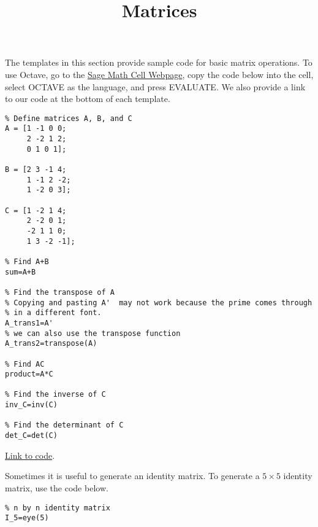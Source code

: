 \documentclass{ximera}
\title{Matrices} \license{CC BY-NC-SA 4.0}
\begin{document}
\begin{abstract}
\end{abstract}
\maketitle

The templates in this section provide sample code for basic matrix operations.  To use Octave, go to the \href{https://sagecell.sagemath.org/}{Sage Math Cell Webpage}, copy the code below into the cell, select OCTAVE as the language, and press EVALUATE.  We also provide a link to our code at the bottom of each template.

\begin{template}\label{temp:matrixOps}

\begin{verbatim}
% Define matrices A, B, and C
A = [1 -1 0 0;
     2 -2 1 2;
     0 1 0 1];
     
B = [2 3 -1 4;
     1 -1 2 -2;
     1 -2 0 3];   
     
C = [1 -2 1 4;
     2 -2 0 1;
     -2 1 1 0;
     1 3 -2 -1];     
     
% Find A+B
sum=A+B

% Find the transpose of A
% Copying and pasting A'  may not work because the prime comes through
% in a different font.
A_trans1=A'
% we can also use the transpose function
A_trans2=transpose(A)

% Find AC
product=A*C

% Find the inverse of C
inv_C=inv(C)

% Find the determinant of C
det_C=det(C)
\end{verbatim}

\href{https://sagecell.sagemath.org/?z=eJxdUEFuwyAQvFvyH-YSNWkTyZDcIg6Yqp-oogjZWEGqIcK4_X4XartOOKyY2ZmdhQ3eTWedQa9jsI0ZIPeo99CuhSoLCYFPhgNDhepcFkiH48DBwGdcIbXZZcZlUScbxzEZTzOdxyTviuBkPF7O2TR51RSZIk4PkZQx49xl_yuxlEUilmetpm3wYekp8q0ui2HsRb4sdLwZxKDdcPeDge8g6cnXzDAhX5Lux6DRDvpr8BhJ9GjpRtdE691i42JpbuVuFSXpN-_Bt2MThXxVT0tY923C3wrUInRVgupW7Z6ErYkm9NZpFycxMSSmSuJfcXxtIA==&lang=octave&interacts=eJyLjgUAARUAuQ==}{Link to code}.
\end{template}

\begin{template}\label{temp:id_matrix}
Sometimes it is useful to generate an identity matrix.  To generate a $5\times 5$ identity matrix, use the code below.
\begin{verbatim}
% n by n identity matrix
I_5=eye(5)
\end{verbatim}
\end{template}
\end{document}
